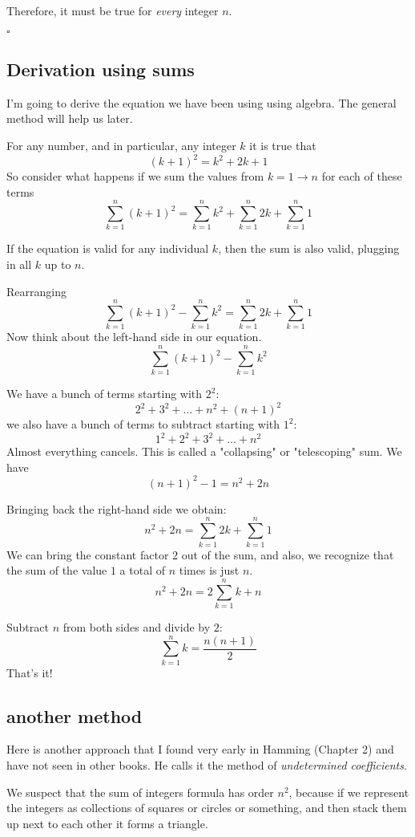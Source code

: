 \documentclass[11pt, oneside]{article}
\begin{document}
Therefore, it must be true for \emph{every} integer $n$.

$\square$

\subsection*{Derivation using sums}
I'm going to derive the equation we have been using using algebra.  The general method will help us later.

For any number, and in particular, any integer $k$ it is true that
\[ (k+1)^2 = k^2 + 2k + 1 \]
So consider what happens if we sum the values from $k=1 \rightarrow n$ for each of these terms
\[ \sum_{k=1}^n (k+1)^2 = \sum_{k=1}^n k^2 + \sum_{k=1}^n 2k + \sum_{k=1}^n 1 \]

If the equation is valid for any individual $k$, then the sum is also valid, plugging in all $k$ up to $n$.

Rearranging
\[ \sum_{k=1}^n (k+1)^2 - \sum_{k=1}^n k^2 = \sum_{k=1}^n 2k + \sum_{k=1}^n 1 \]
Now think about the left-hand side in our equation. 
\[ \sum_{k=1}^n (k+1)^2 - \sum_{k=1}^n k^2 \]

We have a bunch of terms starting with $2^2$:
\[ 2^2 + 3^2 + \dots + n^2 + (n+1)^2 \]
we also have a bunch of terms to subtract starting with $1^2$:
\[ 1^2 + 2^2 + 3^2 + \dots + n^2 \]
Almost everything cancels.  This is called a "collapsing" or "telescoping" sum.  We have
\[ (n+1)^2 - 1 = n^2 + 2n \]

Bringing back the right-hand side  we obtain:
\[ n^2 + 2n = \sum_{k=1}^n 2k + \sum_{k=1}^n 1 \]
We can bring the constant factor $2$ out of the sum, and also, we recognize that the sum of the value $1$ a total of $n$ times is just $n$.
\[ n^2 + 2n = 2\sum_{k=1}^n k + n \]

Subtract $n$ from both sides and divide by $2$:
\[ \sum_{k=1}^n k = \frac{n (n+1)}{2} \]
That's it!

\subsection*{another method}
Here is another approach that I found very early in Hamming (Chapter 2) and have not seen in other books.  He calls it the method of \emph{undetermined coefficients}.  

We suspect that the sum of integers formula has order $n^2$, because if we represent the integers as collections of squares or circles or something, and then stack them up next to each other it forms a triangle.  
\end{document}
